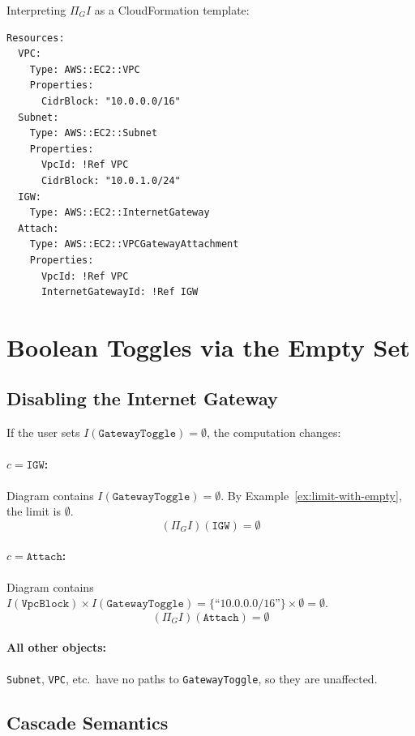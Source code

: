 \documentclass[11pt,a4paper]{article}
\theoremstyle{definition}
\theoremstyle{plain}
\begin{document}
Interpreting $\Pi_G I$ as a CloudFormation template:

\begin{verbatim}
Resources:
  VPC:
    Type: AWS::EC2::VPC
    Properties:
      CidrBlock: "10.0.0.0/16"
  Subnet:
    Type: AWS::EC2::Subnet
    Properties:
      VpcId: !Ref VPC
      CidrBlock: "10.0.1.0/24"
  IGW:
    Type: AWS::EC2::InternetGateway
  Attach:
    Type: AWS::EC2::VPCGatewayAttachment
    Properties:
      VpcId: !Ref VPC
      InternetGatewayId: !Ref IGW
\end{verbatim}

\section{Boolean Toggles via the Empty Set}
\label{sec:toggle}

\subsection{Disabling the Internet Gateway}

If the user sets $I(\texttt{GatewayToggle}) = \emptyset$, the computation changes:

\paragraph{$c = \texttt{IGW}$:} Diagram contains $I(\texttt{GatewayToggle}) = \emptyset$. By Example~\ref{ex:limit-with-empty}, the limit is $\emptyset$.
\[
(\Pi_G I)(\texttt{IGW}) = \emptyset
\]

\paragraph{$c = \texttt{Attach}$:} Diagram contains $I(\texttt{VpcBlock}) \times I(\texttt{GatewayToggle}) = \{\text{``10.0.0.0/16''}\} \times \emptyset = \emptyset$.
\[
(\Pi_G I)(\texttt{Attach}) = \emptyset
\]

\paragraph{All other objects:} \texttt{Subnet}, \texttt{VPC}, etc.\ have no paths to \texttt{GatewayToggle}, so they are unaffected.

\subsection{Cascade Semantics}
\end{document}
